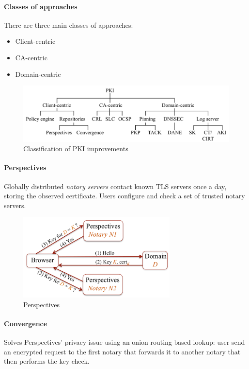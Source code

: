 \paragraph{Classes of approaches} There are three main classes of approaches:
\begin{itemize}
    \item Client-centric
    \item CA-centric
    \item Domain-centric
\end{itemize}
\begin{figure}[h]
    \centering
    \includegraphics[width=13cm]{images/ch10-pki-classes.png}
    \caption{Classification of PKI improvements}
    \label{fig:pki-classes}
\end{figure}

\paragraph{Perspectives} Globally distributed \emph{notary servers} contact known TLS servers once a day, storing the observed certificate. Users configure and check a set of trusted notary servers.

\begin{figure}[h]
    \centering
    \includegraphics[width=8cm]{images/ch10-pki-perspectives.png}
    \caption{Perspectives}
    \label{fig:pki-perspectives}
\end{figure}

\paragraph{Convergence} Solves Perspectives' privacy issue using an onion-routing based lookup: user send an encrypted request to the first notary that forwards it to another notary that then performs the key check.

